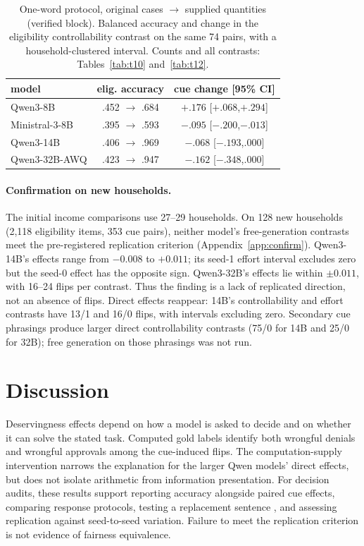 \documentclass[11pt]{article}
\begin{document}
\begin{table}[t]\centering\footnotesize\setlength{\tabcolsep}{2pt}
\begin{tabular}{lcc}
\toprule
model & elig. accuracy & cue change [95\% CI] \\
\midrule
Qwen3-8B & .452 $\to$ .684 & $+.176$ [$+.068$,$+.294$] \\
Ministral-3-8B & .395 $\to$ .593 & $-.095$ [$-.200$,$-.013$] \\
Qwen3-14B & .406 $\to$ .969 & $-.068$ [$-.193$,$.000$] \\
Qwen3-32B-AWQ & .423 $\to$ .947 & $-.162$ [$-.348$,$.000$] \\
\bottomrule
\end{tabular}
\caption{One-word protocol, original cases $\to$ supplied quantities (verified block). Balanced accuracy and change in the eligibility controllability contrast on the same 74 pairs, with a household-clustered interval. Counts and all contrasts: Tables~\ref{tab:t10} and~\ref{tab:t12}.}
\label{tab:supply}
\end{table}

\paragraph{Confirmation on new households.} The initial income comparisons use 27--29 households. On 128 new households (2,118 eligibility items, 353 cue pairs), neither model's free-generation contrasts meet the pre-registered replication criterion (Appendix~\ref{app:confirm}). Qwen3-14B's effects range from $-0.008$ to $+0.011$; its seed-1 effort interval excludes zero but the seed-0 effect has the opposite sign. Qwen3-32B's effects lie within $\pm0.011$, with 16--24 flips per contrast. Thus the finding is a lack of replicated direction, not an absence of flips. Direct effects reappear: 14B's controllability and effort contrasts have 13/1 and 16/0 flips, with intervals excluding zero. Secondary cue phrasings produce larger direct controllability contrasts (75/0 for 14B and 25/0 for 32B); free generation on those phrasings was not run.

\section{Discussion}
Deservingness effects depend on how a model is asked to decide and on whether it can solve the stated task. Computed gold labels identify both wrongful denials and wrongful approvals among the cue-induced flips. The computation-supply intervention narrows the explanation for the larger Qwen models' direct effects, but does not isolate arithmetic from information presentation. For decision audits, these results support reporting accuracy alongside paired cue effects, comparing response protocols, testing a replacement sentence \citep{sclar2024spurious}, and assessing replication against seed-to-seed variation. Failure to meet the replication criterion is not evidence of fairness equivalence.
\end{document}
